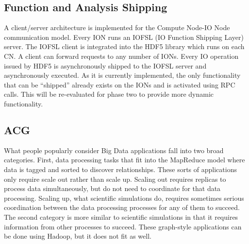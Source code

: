 \documentclass[conference]{IEEEtran}
\newcommand{\DDTns}{D\textsuperscript{2}T}
\begin{document}
%

\subsection{Function and Analysis Shipping}
\label{sec:fn-shipping}

A client/server architecture is implemented for the Compute Node-IO Node
communication model.  Every ION runs an IOFSL (IO Function Shipping Layer)
server. The IOFSL client is integrated into the HDF5 library which runs on each
CN. A client can forward requests to any number of IONs. Every IO operation
issued by HDF5 is asynchronously shipped to the IOFSL server and asynchronously
executed. As it is currently implemented, the only functionality that can be
``shipped'' already exists on the IONs and is activated using RPC calls. This
will be re-evaluated for phase two to provide more dynamic functionality.

\subsection{ACG}
\label{sec:acg}

What people popularly consider Big Data applications fall into two broad
categories. First, data processing tasks that fit into the MapReduce model
where data is tagged and sorted to discover relationships. These sorts of
applications only require scale out rather than scale up. Scaling out requires
replicas to process data simultaneously, but do not need to coordinate for that
data processing. Scaling up, what scientific simulations do, requires sometimes
serious coordination between the data processing processes for any of them to
succeed. The second category is more similar to scientific simulations in that
it requires information from other processes to succeed. These graph-style
applications can be done using Hadoop, but it does not fit as well.
\end{document}
